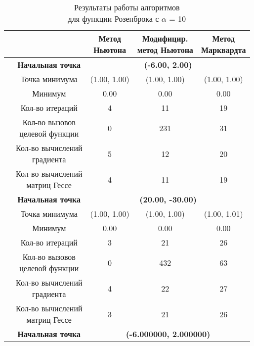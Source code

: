 \begin{table}[H]
        \centering
        \vspace*{-1.5em}
        \caption{Результаты работы алгоритмов\\для функции Розенброка с $\alpha$ = 10}
        \footnotesize
        \begin{tabular}{|c|c|c|c|c|}
        \hline
        & &\makecell{Метод\\Ньютона} &\makecell{Модифицир.\\метод Ньютона} &\makecell{Метод\\Марквардта} \\
        \hline
	\multirow{12}{*}{\rotatebox[origin=c]{90}{$\varepsilon = 0.01$}}&\textbf{Начальная точка} &\multicolumn{3}{c|}{\textbf{(-6.00, 2.00)}}\\
	\cline{2-5}
	&Точка минимума &(1.00, 1.00) &(1.00, 1.00) &(1.00, 1.00) \\ 
	\cline{2-5}
	&Минимум &0.00 &0.00 &0.00 \\ 
	\cline{2-5}
	&Кол-во итераций &4 &11 &19 \\ 
	\cline{2-5}
	&\makecell{Кол-во вызовов\\целевой функции} &0 &231 &31 \\ 
	\cline{2-5}
	&\makecell{Кол-во вычислений\\градиента} &5 &12 &20 \\ 
	\cline{2-5}
	&\makecell{Кол-во вычислений\\матриц Гессе} &4 &11 &19 \\ 
	\cline{2-5}
\cline{2-5}&\textbf{Начальная точка} &\multicolumn{3}{c|}{\textbf{(20.00, -30.00)}}\\
	\cline{2-5}
	&Точка минимума &(1.00, 1.00) &(1.00, 1.00) &(1.00, 1.01) \\ 
	\cline{2-5}
	&Минимум &0.00 &0.00 &0.00 \\ 
	\cline{2-5}
	&Кол-во итераций &3 &21 &26 \\ 
	\cline{2-5}
	&\makecell{Кол-во вызовов\\целевой функции} &0 &432 &63 \\ 
	\cline{2-5}
	&\makecell{Кол-во вычислений\\градиента} &4 &22 &27 \\ 
	\cline{2-5}
	&\makecell{Кол-во вычислений\\матриц Гессе} &3 &21 &26 \\ 
	\cline{2-5}
	\hline
	\multirow{12}{*}{\rotatebox[origin=c]{90}{$\varepsilon = 1e-06$}}&\textbf{Начальная точка} &\multicolumn{3}{c|}{\textbf{(-6.000000, 2.000000)}}\\

\end{tabular}
\end{table}
